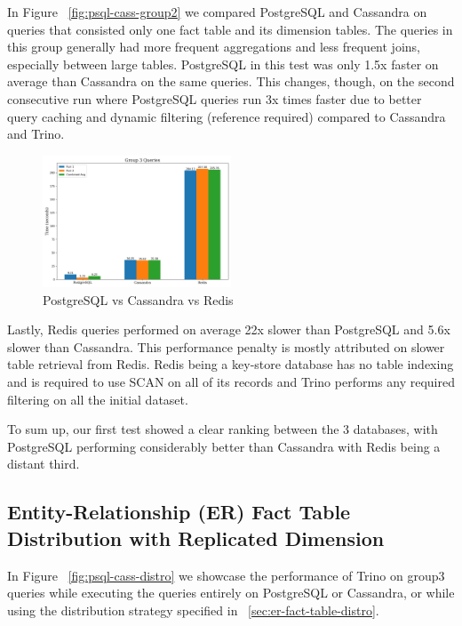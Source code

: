 \documentclass[conference]{IEEEtran}
\begin{document}
In Figure ~\ref{fig:psql-cass-group2} we compared PostgreSQL and Cassandra on queries that consisted only one fact table and its dimension tables. The queries in this group generally had more frequent aggregations and less frequent joins, especially between large tables. PostgreSQL in this test was only 1.5x faster on average than Cassandra on the same queries. This changes, though, on the second consecutive run where PostgreSQL queries run 3x times faster due to better query caching and dynamic filtering (reference required) compared to Cassandra and Trino.

\begin{figure}[h]
	\centering
	\includegraphics[width=0.5\textwidth]{images/DBs_bench_no_distro/group3.png}
	\caption{PostgreSQL vs Cassandra vs Redis}
	\label{fig:psql-cass-redis-group3}
\end{figure}

Lastly, Redis queries performed on average 22x slower than PostgreSQL and 5.6x slower than Cassandra. This performance penalty is mostly attributed on slower table retrieval from Redis. Redis being a key-store database has no table indexing and is required to use SCAN on all of its records and Trino performs any required filtering on all the initial dataset.

To sum up, our first test showed a clear ranking between the 3 databases, with PostgreSQL performing considerably better than Cassandra with Redis being a distant third.

\subsection{Entity-Relationship (ER) Fact Table Distribution with
	Replicated Dimension}
\label{sec:distribution-based-on-fact-tables-er}

In Figure ~\ref{fig:psql-cass-distro} we showcase the performance of Trino on group3 queries while executing the queries entirely on PostgreSQL or Cassandra, or while using the distribution strategy specified in ~\ref{sec:er-fact-table-distro}.
\end{document}
